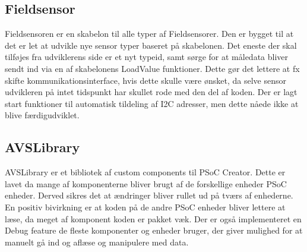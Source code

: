 \subsection{Fieldsensor}
Fieldsensoren er en skabelon til alle typer af Fieldsensorer. Den er bygget til at det er let at udvikle nye sensor typer baseret på skabelonen. Det eneste der skal tilføjes fra udviklerens side er et nyt typeid, samt sørge for at måledata bliver sendt ind via en af skabelonens LoadValue funktioner. Dette gør det lettere at fx skifte kommunikationsinterface, hvis dette skulle være ønsket, da selve sensor udvikleren på intet tidspunkt har skullet rode med den del af koden. Der er lagt start funktioner til automatisk tildeling af I2C adresser, men dette nåede ikke at blive færdigudviklet.

\subsection{AVSLibrary}
AVSLibrary er et bibliotek af custom components til PSoC Creator. Dette er lavet da mange af komponenterne bliver brugt af de forskellige enheder PSoC enheder. Derved sikres det at ændringer bliver rullet ud på tværs af enhederne. En positiv bivirkning er at koden på de andre PSoC enheder bliver lettere at læse, da meget af komponent koden er pakket væk. Der er også implementeret en Debug feature de fleste komponenter og enheder bruger, der giver mulighed for at manuelt gå ind og aflæse og manipulere med data.
